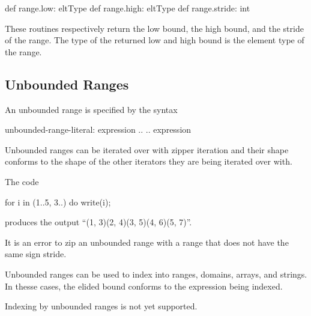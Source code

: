 \begin{protohead}
def range.low: eltType
def range.high: eltType
def range.stride: int
\end{protohead}
\begin{protobody}
These routines respectively return the low bound, the high bound, and
the stride of the range.  The type of the returned low and high bound
is the element type of the range.
\end{protobody}

\subsection{Unbounded Ranges}
\label{Unbounded_Ranges}

An unbounded range is specified by the syntax
\begin{syntax}
unbounded-range-literal:
  expression ..
  .. expression
\end{syntax}

Unbounded ranges can be iterated over with zipper iteration and their
shape conforms to the shape of the other iterators they are being
iterated over with.
\begin{example}
The code
\begin{chapel}
for i in (1..5, 3..) do
  write(i);
\end{chapel}
produces the output ``(1, 3)(2, 4)(3, 5)(4, 6)(5, 7)''.
\end{example}

It is an error to zip an unbounded range with a range that does not
have the same sign stride.

Unbounded ranges can be used to index into ranges, domains, arrays,
and strings.  In thesse cases, the elided bound conforms to the
expression being indexed.
\begin{status}
Indexing by unbounded ranges is not yet supported.
\end{status}
